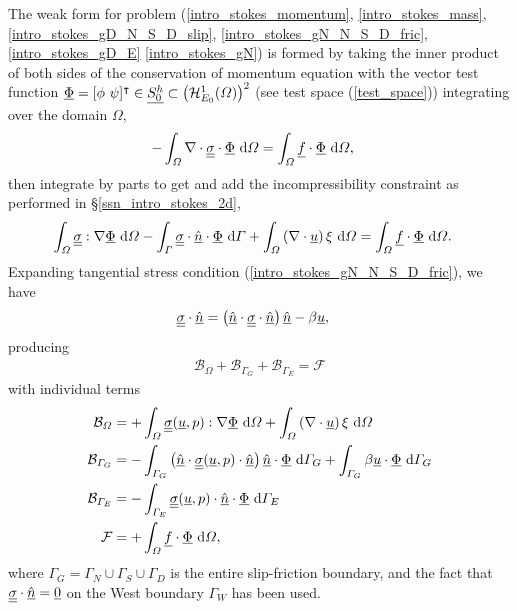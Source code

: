 The weak form for problem (\ref{intro_stokes_momentum}, \ref{intro_stokes_mass}, \ref{intro_stokes_gD_N_S_D_slip}, \ref{intro_stokes_gN_N_S_D_fric}, \ref{intro_stokes_gD_E} \ref{intro_stokes_gN}) is formed by taking the inner product of both sides of the conservation of momentum equation with the vector test function $\underline{\Phi} = [\phi\ \psi ]^\intercal \in \underline{S_0^h} \subset \left( \mathcal{H}_{E_0}^1(\varOmega) \right)^2$ (see test space (\ref{test_space})) integrating over the domain $\Omega$,
\begin{align*}
  -\int_{\varOmega} \nabla \cdot \underline{\underline{\sigma}} \cdot \underline{\Phi} \ \mathrm{d}\varOmega &= \int_{\varOmega} \underline{f} \cdot \underline{\Phi} \ \mathrm{d}\varOmega,
\end{align*}
then integrate by parts to get and add the incompressibility constraint as performed in \S \ref{ssn_intro_stokes_2d},
{\footnotesize
\begin{align}
  \label{intro_stokes_slip_first_var_form}
  \int_{\varOmega} \underline{\underline{\sigma}} : \nabla \underline{\Phi} \ \mathrm{d}\varOmega - \int_{\varGamma} \underline{\underline{\sigma}} \cdot \underline{\hat{n}} \cdot \underline{\Phi} \ \mathrm{d}\varGamma + \int_{\varOmega} \left( \nabla \cdot \underline{u} \right) \xi \ \mathrm{d}\varOmega &= \int_{\varOmega} \underline{f} \cdot \underline{\Phi} \ \mathrm{d}\varOmega.
\end{align}}
Expanding tangential stress condition (\ref{intro_stokes_gN_N_S_D_fric}), we have
\begin{align*}
  \underline{\underline{\sigma}} \cdot \underline{\hat{n}} &= \left( \underline{\hat{n}} \cdot \underline{\underline{\sigma}} \cdot \underline{\hat{n}} \right) \underline{\hat{n}} - \beta \underline{u},
\end{align*}
producing
\begin{align}
  \label{intro_stokes_slip_intermediate_var_form}
  \mathcal{B}_{\Omega} + \mathcal{B}_{\Gamma_G} + \mathcal{B}_{\Gamma_E} = \mathcal{F}
\end{align}
with individual terms
\begin{align*}
  \mathcal{B}_{\varOmega} &= + \int_{\varOmega} \underline{\underline{\sigma}}(\underline{u},p) : \nabla \underline{\Phi} \ \mathrm{d}\varOmega + \int_{\varOmega} \left( \nabla \cdot \underline{u} \right) \xi \ \mathrm{d}\varOmega \\
  \mathcal{B}_{\varGamma_G} &= - \int_{\varGamma_G} \left( \underline{\hat{n}} \cdot \underline{\underline{\sigma}}(\underline{u},p) \cdot \underline{\hat{n}} \right) \underline{\hat{n}} \cdot \underline{\Phi} \ \mathrm{d}\varGamma_G + \int_{\varGamma_G} \beta \underline{u} \cdot \underline{\Phi} \ \mathrm{d}\varGamma_G \\
  \mathcal{B}_{\varGamma_E} &= - \int_{\varGamma_E} \underline{\underline{\sigma}}(\underline{u},p) \cdot \underline{\hat{n}} \cdot \underline{\Phi} \ \mathrm{d}\varGamma_E \\
  \mathcal{F} &= + \int_{\varOmega} \underline{f} \cdot \underline{\Phi} \ \mathrm{d}\varOmega, 
\end{align*}
where $\Gamma_G = \Gamma_N \cup \Gamma_S \cup \Gamma_D$ is the entire slip-friction boundary, and the fact that $\underline{\underline{\sigma}} \cdot \underline{\hat{n}} = \underline{0}$ on the West boundary $\Gamma_W$ has been used.

